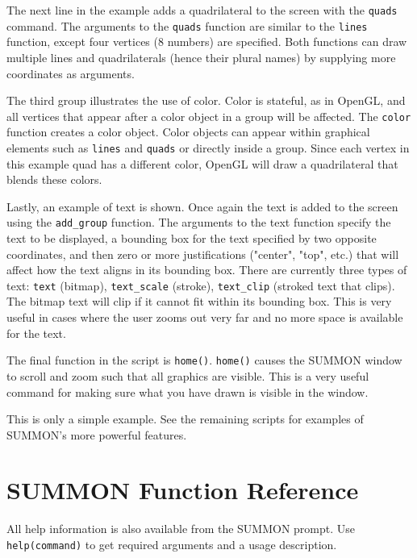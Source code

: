 \documentclass[12pt]{article}
\newcommand{\code}[1]{{\tt #1}}
\begin{document}
The next line in the example adds a quadrilateral to the screen with the
\code{quads} command.  The arguments to the \code{quads} function are similar to
the \code{lines} function, except four vertices (8 numbers) are specified.  Both
functions can draw multiple lines and quadrilaterals (hence their plural names)
by supplying more coordinates as arguments.

The third group illustrates the use of color.  Color is stateful, as in OpenGL,
and all vertices that appear after a color object in a group will be affected. 
The \code{color} function creates a color object.  Color objects can appear
within graphical elements such as \code{lines} and \code{quads} or directly
inside a group.  Since each vertex in this example quad has a different color,
OpenGL will draw a quadrilateral that blends these colors.

Lastly, an example of text is shown.  Once again the text is added to the screen
using the \code{add\_group} function.  The arguments to the text function
specify the text to be displayed, a bounding box for the text specified by two
opposite  coordinates, and then zero or more justifications ("center", "top",
etc.) that will affect how the text aligns in its bounding box.  There are
currently three types of text: \code{text} (bitmap), \code{text\_scale} (stroke),
\code{text\_clip} (stroked text that clips).  The bitmap text will clip if it
cannot fit within its bounding box.  This is very useful in cases where the user
zooms out very far and no more space is available for the text.

The final function in the script is \code{home()}.  \code{home()} causes the
SUMMON window to scroll and zoom such that all graphics are visible.  This is a
very useful command for making sure what you have drawn is visible in the
window.

This is only a simple example.  See the remaining scripts for examples of
SUMMON's more powerful features.



\section{SUMMON Function Reference}

All help information is also available from the SUMMON prompt.  Use 
\code{help(command)} to get required arguments and a usage description.


\end{document}
